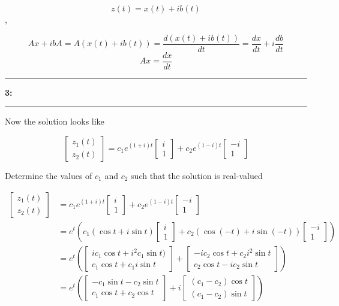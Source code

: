 \documentclass[11pt]{article}
\newcommand\question[2]{\vspace{.25in}\hrule\textbf{#1: #2}\vspace{.5em}\hrule\vspace{.10in}}
\begin{document}
\[z(t) = x(t) + ib(t)\],

\[Ax + ibA=A(x(t) + ib(t))=\frac{d(x(t) + ib(t))}{dt} = \frac{dx}{dt}+i\frac{db}{dt}\]
\[Ax = \frac{dx}{dt}\]

\question{3}{}
Now the solution looks like

\[\begin{bmatrix}z_{1}\left( t\right)  \\ z_{2}\left( t\right)  \end{bmatrix} =c_{1}e^{(1+i)t}\begin{bmatrix}i\\ 1\end{bmatrix} +c_{2}e^{\left( 1-i\right)  t}\begin{bmatrix}-i\\ 1\end{bmatrix} \]

Determine the values of $c_1$ and $c_2$ such that the solution is real-valued

\begin{align*}
    \begin{bmatrix}z_{1}\left( t\right)  \\ z_{2}\left( t\right)  \end{bmatrix} 
     &=c_{1}e^{(1+i)t}\begin{bmatrix}i\\ 1\end{bmatrix} +c_{2}e^{\left( 1-i\right)  t}\begin{bmatrix}-i\\ 1\end{bmatrix}\\
     &=e^t\left(c_1(\cos t + i\sin t)\begin{bmatrix}i \\ 1\end{bmatrix} + c_2(\cos(-t) + i\sin(-t))\begin{bmatrix}
       -i \\ 1 
     \end{bmatrix}\right)\\
     &= e^t\left(\begin{bmatrix} ic_1\cos t + i^2c_1\sin t) \\ c_1\cos t + c_1i\sin t\end{bmatrix} + \begin{bmatrix} -ic_2\cos t + c_2i^2\sin t \\ c_2\cos t - ic_2\sin t\end{bmatrix}\right)\\
     &= e^t\left(\begin{bmatrix} -c_1\sin t -c_2\sin t \\ c_1\cos t + c_2\cos t \end{bmatrix} + i \begin{bmatrix} (c_1-c_2) \cos t  \\ (c_1-c_2)\sin t \end{bmatrix}\right)
\end{align*}
\end{document}
